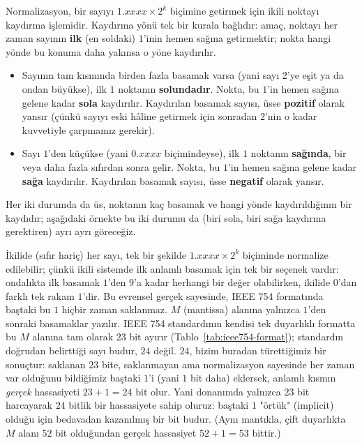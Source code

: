 Normalizasyon, bir sayıyı $1.xxxx\times2^k$ biçimine getirmek için ikili noktayı
kaydırma işlemidir. Kaydırma yönü tek bir kurala bağlıdır: amaç, noktayı her zaman
sayının \textbf{ilk} (en soldaki) $1$'inin hemen sağına getirmektir; nokta hangi yönde
bu konuma daha yakınsa o yöne kaydırılır.
\begin{itemize}[nosep, leftmargin=*]
    \item Sayının tam kısmında birden fazla basamak varsa (yani sayı $2$'ye eşit ya da
    ondan büyükse), ilk $1$ noktanın \textbf{solundadır}. Nokta, bu $1$'in hemen sağına
    gelene kadar \textbf{sola} kaydırılır. Kaydırılan basamak sayısı, üsse
    \textbf{pozitif} olarak yansır (çünkü sayıyı eski hâline getirmek için sonradan
    $2$'nin o kadar kuvvetiyle çarpmamız gerekir).
    \item Sayı $1$'den küçükse (yani $0.xxxx$ biçimindeyse), ilk $1$ noktanın
    \textbf{sağında}, bir veya daha fazla sıfırdan sonra gelir. Nokta, bu $1$'in hemen
    sağına gelene kadar \textbf{sağa} kaydırılır. Kaydırılan basamak sayısı, üsse
    \textbf{negatif} olarak yansır.
\end{itemize}
Her iki durumda da üs, noktanın kaç basamak ve hangi yönde kaydırıldığının bir kaydıdır;
aşağıdaki örnekte bu iki durumu da (biri sola, biri sağa kaydırma gerektiren) ayrı ayrı
göreceğiz.

\begin{bilginot}
İkilide (sıfır hariç) her sayı, tek bir şekilde $1.xxxx\times2^k$ biçiminde normalize
edilebilir; çünkü ikili sistemde ilk anlamlı basamak için tek bir seçenek vardır: ondalıkta
ilk basamak $1$'den $9$'a kadar herhangi bir değer olabilirken, ikilide $0$'dan farklı tek
rakam $1$'dir. Bu evrensel gerçek sayesinde, IEEE 754 formatında baştaki bu $1$ hiçbir zaman
saklanmaz. $M$ (mantissa) alanına yalnızca $1$'den sonraki basamaklar yazılır. IEEE 754
standardının kendisi tek duyarlıklı formatta bu $M$ alanına tam olarak $23$ bit ayırır
(Tablo~\ref{tab:ieee754-format}); standardın doğrudan belirttiği sayı budur, $24$ değil.
$24$, bizim buradan türettiğimiz bir sonuçtur: saklanan $23$ bite, saklanmayan ama
normalizasyon sayesinde her zaman var olduğunu bildiğimiz baştaki $1$'i (yani $1$ bit
daha) eklersek, anlamlı kısmın \emph{gerçek} hassasiyeti $23+1=24$ bit olur. Yani
donanımda yalnızca $23$ bit harcayarak $24$ bitlik bir hassasiyete sahip oluruz: baştaki
$1$ "örtük" (implicit) olduğu için bedavadan kazanılmış bir bit budur. (Aynı mantıkla,
çift duyarlıkta $M$ alanı $52$ bit olduğundan gerçek hassasiyet $52+1=53$ bittir.)
\end{bilginot}

